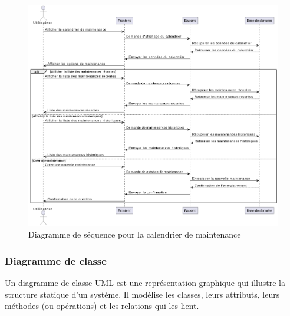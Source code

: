 \begin{figure}[H]
	\centering
	\includegraphics[width=17cm]{./img/composants/diagramme/seq/calendrier.png}
	\caption{Diagramme de séquence pour la calendrier de maintenance}
\end{figure}

\subsubsection{Diagramme de classe}

Un diagramme de classe UML est une représentation graphique qui illustre la structure statique d'un système. Il modélise les classes, leurs attributs, leurs méthodes (ou opérations) et les relations qui les lient.

